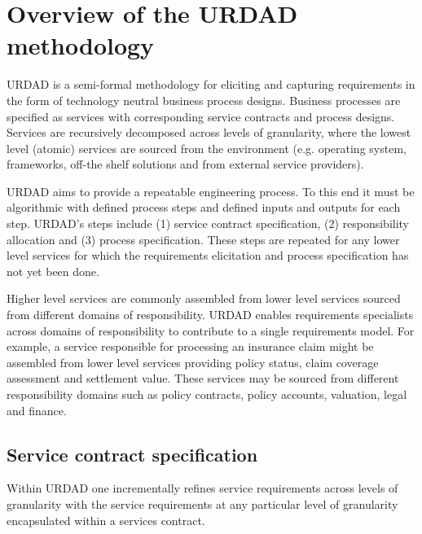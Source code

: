\section{Overview of the URDAD methodology \label{sec:urdadMethodology}}

URDAD is a semi-formal methodology for eliciting and capturing requirements in the form of technology neutral business process designs\cite{solms_urdad_2010}. Business processes are specified as services with corresponding service contracts and process designs. Services are recursively decomposed across levels of granularity, where the lowest level (atomic) services are sourced from the environment (e.g. operating system, frameworks, off-the shelf solutions and from external service providers). 

URDAD aims to provide a repeatable engineering process. To this end it must be algorithmic with defined process steps and defined inputs and outputs for each step. URDAD's steps include (1) service contract specification, (2) responsibility allocation and (3) process specification. These steps are repeated for any lower level services for which the requirements elicitation and process specification has not yet been done.

Higher level services are commonly assembled from lower level services sourced from different domains of responsibility. URDAD enables requirements specialists across domains of responsibility to contribute to a single requirements model. For example, a service responsible for processing an insurance claim might be assembled from lower level services providing policy status, claim coverage assessment and settlement value. These services may be sourced from different responsibility domains such as policy contracts, policy accounts, valuation, legal and finance. 

\subsection{Service contract specification}

Within URDAD one incrementally refines service requirements across levels of granularity with the service requirements at any particular level of granularity encapsulated within a services contract. 

